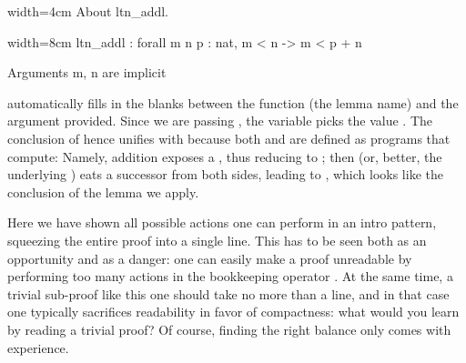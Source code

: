 \begin{coq}{}{width=4cm}
About ltn_addl.
\end{coq}
\begin{coqout}{}{width=8cm}
ltn_addl : forall m n p : nat, m < n -> m < p + n

Arguments m, n are implicit
\end{coqout}

 automatically fills in the blanks between the function
(the lemma name) and the argument  provided.
Since we are passing , the
variable  picks the value .  The conclusion of 
hence unifies with  because both \C{+} and \C{<} are
defined as programs that compute: Namely, addition exposes a ,
thus reducing to ; then \C{<} (or, better, the underlying
\C{<=}) eats a successor from both sides, leading to ,
which looks like the conclusion of the lemma we apply.

Here we have shown all possible actions one can perform in an intro
pattern, squeezing the entire proof into a single line.  This has
to be seen both as an opportunity and as a danger: one can easily
make a proof unreadable by performing too many actions in the bookkeeping
operator \C{=>}.  At the same time, a trivial sub-proof like this one
should take no more than a line, and in that case one typically
sacrifices readability in favor of compactness: what would you learn by
reading a trivial proof?  Of course,
finding the right balance only comes with experience.


%

